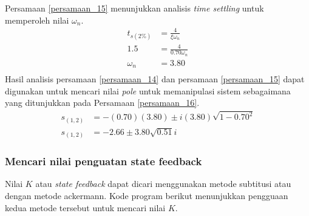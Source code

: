 \documentclass[../main.tex]{subfiles}
\begin{document}
                    Persamaan \eqref{persamaan_15} menunjukkan analisis \textit{time settling} untuk memperoleh nilai $\omega_n$.
                    \begin{equation}
                        \begin{split}
                            t_{s(2\%)} &= \frac{4}{\xi\omega_n} \\[5pt]
                            1.5 &= \frac{4}{0.70\omega_n} \\[5pt]
                            \omega_n &= 3.80 \\[5pt]
                            \label{persamaan_15}
                        \end{split}
                    \end{equation}
                    Hasil analisis persamaan \eqref{persamaan_14} dan persamaan \eqref{persamaan_15} dapat digunakan untuk mencari nilai \textit{pole} untuk memanipulasi sistem sebagaimana yang ditunjukkan pada Persamaan \eqref{persamaan_16}. 
                    \begin{equation}
                        \begin{split}
                            s_{(1,2)} &= -(0.70)(3.80) \pm i (3.80) \sqrt{1 - 0.70^2}\\[5pt]
                            s_{(1,2)} &= - 2.66 \pm 3.80 \sqrt{0.51} i
                            \label{persamaan_16}
                        \end{split}
                    \end{equation}
                \subsubsection{Mencari nilai penguatan state feedback}
                    Nilai $K$ atau \textit{state feedback} dapat dicari menggunakan metode subtitusi atau dengan metode ackermann. Kode program berikut menunjukkan pengguaan kedua metode tersebut untuk mencari nilai $K$.
                    
                    
\end{document}
